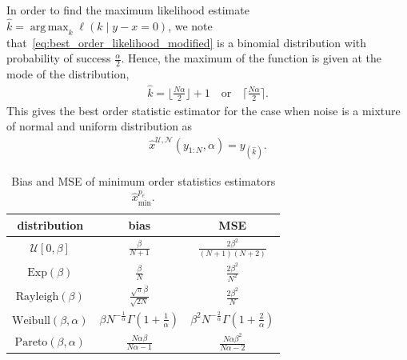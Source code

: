\documentclass{article}
\DeclareMathOperator*{\argmax}{arg\,max}
\begin{document}
In order to find the maximum likelihood estimate $\hat{k} = \argmax_k \ell(k\mid y-x=0)$, we note that~\eqref{eq:best_order_likelihood_modified} is a binomial distribution with probability of success $\frac{\alpha}{2}$. Hence, the maximum of the function is given at the mode of the distribution, 
%
%
\begin{align}
\hat{k}=\lfloor \frac{N\alpha}{2}\rfloor+1\quad \mathrm{or}\quad \lceil\frac{N\alpha}{2}\rceil.
\end{align}
%
%
This gives the best order statistic estimator for the case when noise is a mixture of normal and uniform distribution as
%
%
\begin{align}
\hat{x}^{\mathrm{\mathrm{\mathcal{U},\mathcal{N}}}}(y_{1:N},\alpha)= y_{(\hat{k})}.
\end{align}
%
%
\begin{table}[ht]
	\centering
	\caption{Bias and MSE of minimum order statistics estimators $\hat{x}_{\mathrm{min}}^{p_e}$.}
	\begin{tabular}{c|c|c}
		\hline
		distribution                     & bias                                                   & MSE                                                      \\ \hline
		$\mathcal{U}[0,\beta]$               & $\frac{\beta}{N+1}$                                        & $\frac{2\beta^2}{(N+1)(N+2)}$                            \\[2mm] \hline
		$\mathrm{Exp}(\beta)$            & $\frac{\beta}{N}$                                      & $\frac{2\beta^2}{N^2}$                                   \\[2mm] \hline
		$\mathrm{Rayleigh}(\beta)$       & $\frac{\sqrt{\pi}\beta}{\sqrt{2N}}$                    & $\frac{2\beta^2}{N}$                                     \\[2mm] \hline
		$\mathrm{Weibull}(\beta,\alpha)$ & $\beta N^{-\frac{1}{\alpha}}\Gamma(1+\frac{1}{\alpha})$ & $\beta^2N^{-\frac{2}{\alpha}}\Gamma(1+\frac{2}{\alpha})$ \\[2mm] \hline
		$\mathrm{Pareto}(\beta,\alpha)$  & $\frac{N\alpha\beta}{N\alpha -1}$                      & $\frac{N\alpha\beta^2}{N\alpha -2}$                      \\ \hline
	\end{tabular}
	\label{tbl:estimators_biased}
\end{table}
\end{document}
